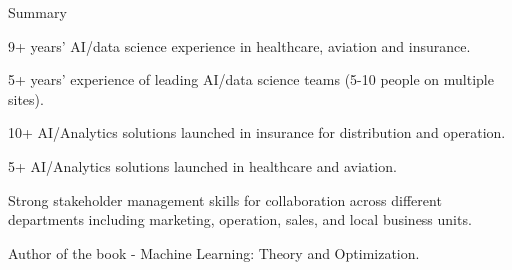 \documentclass{resume} %
\begin{document}

\begin{rSection}{Summary} 

\begin{rSubsection}{}{}{}{}
\item 9+ years' AI/data science experience in healthcare, aviation and insurance.
\item 5+ years' experience of leading AI/data science teams (5-10 people on multiple sites).
\item 10+ AI/Analytics solutions launched in insurance for distribution and operation.
\item 5+ AI/Analytics solutions launched in healthcare and aviation.
\item Strong stakeholder management skills for collaboration across different departments including marketing, operation, sales, and local business units.
\item Author of the book - Machine Learning: Theory and Optimization.
\end{rSubsection}


\end{rSection}

\end{document}
